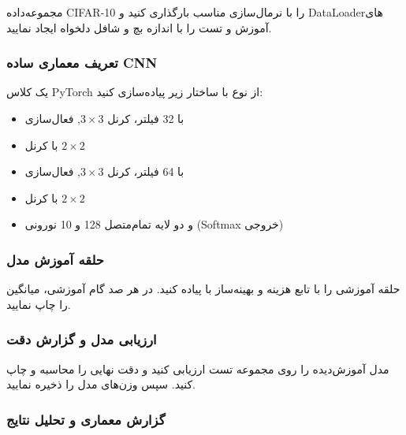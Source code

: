		مجموعه‌داده CIFAR-10 را با نرمال‌سازی مناسب بارگذاری کنید و DataLoader‌‌های آموزش و تست را با اندازه بچ و شافل دلخواه ایجاد نمایید.

		


		\subsubsection{تعریف معماری ساده CNN}

		یک کلاس PyTorch از نوع  با ساختار زیر پیاده‌سازی کنید:
		\begin{itemize}
			\item {} با 32 فیلتر، کرنل $3\times3$, فعال‌سازی 
			\item {} با کرنل $2\times2$
			\item {} با 64 فیلتر، کرنل $3\times3$, فعال‌سازی 
			\item {} با کرنل $2\times2$
			\item {} و دو لایه تمام‌متصل 128 و 10 نورونی (Softmax خروجی)
		\end{itemize}

		


		\subsubsection{حلقه آموزش مدل}

		حلقه آموزشی را با تابع هزینه  و بهینه‌ساز  با  پیاده کنید. در هر صد گام آموزشی، میانگین  را چاپ نمایید.

		


		\subsubsection{ارزیابی مدل و گزارش دقت}

		مدل آموزش‌دیده را روی مجموعه تست ارزیابی کنید و دقت نهایی را محاسبه و چاپ کنید. سپس وزن‌های مدل را ذخیره نمایید.

		


		\subsubsection{گزارش معماری و تحلیل نتایج}

